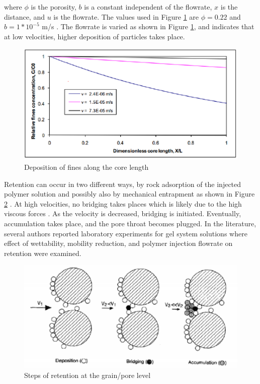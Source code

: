 where $\phi$ is the porosity, $b$ is a constant independent of the flowrate, $x$ is the distance, and $u$ is the flowrate. The values used in Figure \ref{fig:finesDeposition} are $\phi = 0.22$ and $b = 1*10^{-5}$ m/s \citep{Stavland2011}. The flowrate is varied as shown in Figure \ref{fig:finesDeposition}, and indicates that at low velocities, higher deposition of particles takes place.

\begin{figure}
    \centering
    \includegraphics[width=\textwidth]{img/fig/finesDeposition.png}
    \caption{Deposition of fines along the core length \citep{Stavland2011}}
    \label{fig:finesDeposition} %
\end{figure}

Retention  can occur in two different ways, by rock adsorption  of the injected polymer solution and possibly also by mechanical entrapment  as shown in Figure \ref{fig:retention} \citep{Nabzar1996}. At high velocities, no bridging takes places which is likely due to the high viscous forces \citep{Stavland2011}. As the velocity is decreased, bridging is initiated. Eventually, accumulation takes place, and the pore throat becomes plugged. In the literature, several authors reported laboratory experiments for gel system solutions where effect of wettability, mobility reduction, and polymer injection flowrate on retention were examined\citep{Broseta1995, Cohen1986, Idahosa2016}.

\begin{figure}
    \centering
    \includegraphics[width=\textwidth]{img/fig/retention.png}
    \caption{Steps of retention at the grain/pore level \citep{Nabzar1996}}
    \label{fig:retention} %
\end{figure}



